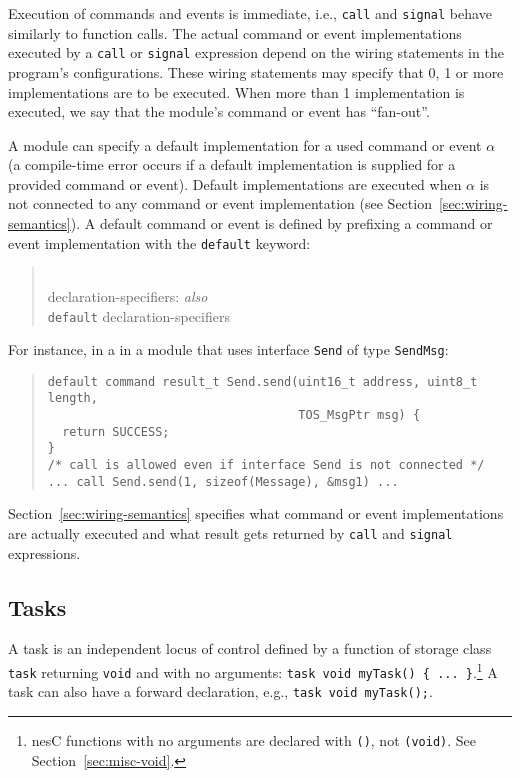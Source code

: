 \documentclass[11pt,letterpaper]{article}
\newcommand{\kw}[1]{{\tt #1}}
\newcommand{\code}[1]{{\tt #1}}
\newcommand{\nesc}{nesC\xspace}
\newcommand{\grammarshift}{\vspace*{-.7cm}}
\newcommand{\grammarindent}{\hspace*{2cm}\= \\ \kill}
\begin{document}
Execution of commands and events is immediate, i.e., \kw{call} and
\kw{signal} behave similarly to function calls. The actual command or event
implementations executed by a \code{call} or \code{signal} expression
depend on the wiring statements in the program's configurations. These
wiring statements may specify that 0, 1 or more implementations are to be
executed. When more than 1 implementation is executed, we say that the
module's command or event has ``fan-out''.  

A module can specify a default implementation for a used command or
event $\alpha$ (a compile-time error occurs if a default
implementation is supplied for a provided command or event). Default
implementations are executed when $\alpha$ is not connected to any
command or event implementation (see
Section~\ref{sec:wiring-semantics}). A default command or event is
defined by prefixing a command or event implementation with the
\kw{default} keyword:
\begin{quote} \grammarshift \em \begin{tabbing}
\grammarindent
declaration-specifiers: \emph{also}\\
\>	\kw{default} declaration-specifiers\\
\end{tabbing} \end{quote}
For instance, in a in a module that uses interface \code{Send} of type
\kw{SendMsg}:
\begin{quote} \begin{verbatim}
default command result_t Send.send(uint16_t address, uint8_t length, 
                                   TOS_MsgPtr msg) {
  return SUCCESS;
}
/* call is allowed even if interface Send is not connected */
... call Send.send(1, sizeof(Message), &msg1) ...
\end{verbatim} \end{quote}

Section~\ref{sec:wiring-semantics} specifies what command or event
implementations are actually executed and what result gets returned by
\code{call} and \code{signal} expressions.

\subsection{Tasks}

A task is an independent locus of control defined by a function of
storage class \kw{task} returning \kw{void} and with no arguments:
\code{task void myTask() \{ ... \}}.\footnote{\nesc functions with no
arguments are declared with \code{()}, not \code{(void)}. See
Section~\ref{sec:misc-void}.} A task can also have a forward declaration, e.g.,
\code{task void myTask();}.
\end{document}
